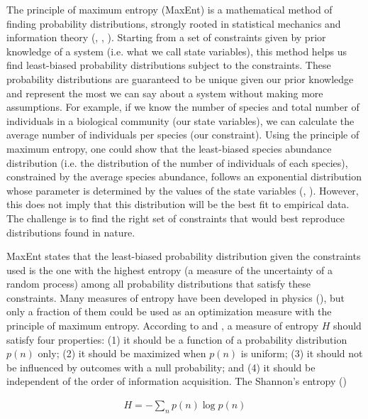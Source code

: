 The principle of maximum entropy (MaxEnt) is a mathematical method of finding
probability distributions, strongly rooted in statistical mechanics and
information theory (\cite{Jaynes1957Information}, \cite{Jaynes1957Informationa},
\cite{Harremoes2001Maximum}). Starting from a set of constraints given by prior
knowledge of a system (i.e. what we call state variables), this method helps us
find least-biased probability distributions subject to the constraints. These
probability distributions are guaranteed to be unique given our prior knowledge
and represent the most we can say about a system without making more
assumptions. For example, if we know the number of species and total number of
individuals in a biological community (our state variables), we can calculate
the average number of individuals per species (our constraint). Using the
principle of maximum entropy, one could show that the least-biased species
abundance distribution (i.e. the distribution of the number of individuals of
each species), constrained by the average species abundance, follows an
exponential distribution whose parameter is determined by the values of the
state variables (\cite{Frank2011Simple}, \cite{Harte2014Maximum}). However,
this does not imply that this distribution will be the best fit to empirical
data. The challenge is to find the right set of constraints that would best
reproduce distributions found in nature. 

MaxEnt states that the least-biased probability distribution given the
constraints used is the one with the highest entropy (a measure of the
uncertainty of a random process) among all probability distributions that
satisfy these constraints. Many measures of entropy have been developed in
physics (\cite{Beck2009Generalised}), but only a fraction of them could be used as
an optimization measure with the principle of maximum entropy. According to
\textcite{Beck2009Generalised} and \textcite{Khinchin2013Mathematical}, a measure of entropy $H$
should satisfy four properties: (1) it should be a function of a probability
distribution $p(n)$ only; (2) it should be maximized when $p(n)$ is uniform; (3)
it should not be influenced by outcomes with a null probability; and (4) it
should be independent of the order of information acquisition. The Shannon's
entropy (\cite{Shannon1948Mathematical})

\begin{eqnarray}
  \label{eq:shannon}
          H = -\sum_{n} p(n) \log p(n)
\end{eqnarray}

